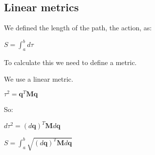 
\subsection{Linear metrics}

We defined the length of the path, the action, as:

\(S=\int_a^b d\tau \)

To calculate this we need to define a metric.

We use a linear metric.

\(\tau^2 = \mathbf q^T\mathbf M\mathbf q\)

So:

\(d\tau^2 =(d\mathbf q)^T\mathbf Md\mathbf q \)

\(S = \int_a^b \sqrt {(d\mathbf q)^T\mathbf Md\mathbf q}\)

